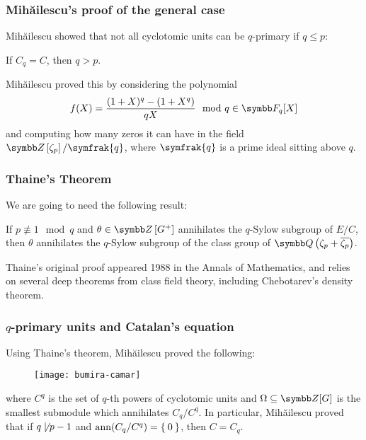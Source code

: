 \begin{frame}
\frametitle{Mihăilescu's proof of the general case}

Mihăilescu showed that not all cyclotomic units can be \(q\)-primary if \(q \leq p\):
\begin{proposition}
If \(C_q = C\), then \(q > p\).
\end{proposition}

\vspace{1em}

Mihăilescu proved this by considering the polynomial
\[
    f(X) = \frac{(1 + X)^q - (1 + X^q)}{q X} \mod{q} \in \finitefield{q}[X]
\]
and computing how many zeros it can have in the field \(\integers\left[\zeta_p\right] / \symfrak{q}\), where \(\symfrak{q}\) is a prime ideal sitting above \(q\).
\end{frame}

\begin{frame}
\frametitle{Thaine's Theorem}

We are going to need the following result:
\begin{theorem}[Thaine, 1988]
If \(p \not\equiv 1 \mod{q}\) and \(\theta \in \integers\left[G^{+}\right]\) annihilates the \(q\)-Sylow subgroup of \(E / C\), then \(\theta\) annihilates the \(q\)-Sylow subgroup of the class group of \(\rationals\left(\zeta_p + \overline{\zeta_p}\right)\).
\end{theorem}

\vspace{1em}

Thaine's original proof \cite{Thaine1988} appeared 1988 in the Annals of Mathematics, and relies on several deep theorems from class field theory, including Chebotarev's density theorem.
\end{frame}

\begin{frame}
\frametitle{\(q\)-primary units and Catalan's equation}

Using Thaine's theorem, Mihăilescu proved the following:
\begin{figure}
    \centering
    \texttt{[image: bumira-camar]}
\end{figure}
where \(C^q\) is the set of \(q\)-th powers of cyclotomic units and \(\Omega \subseteq \integers[G]\) is the smallest submodule which annihilates \(C_q / C^q\). In particular, Mihăilescu proved that if \(q \not\mid p - 1\) and \(\operatorname{ann}(C_q / C^q) = \Set{ 0 }\), then \(C = C_q\).
\end{frame}

